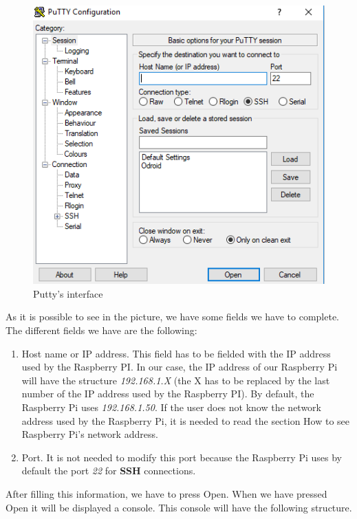 \begin{figure}[H]
\begin{centering}
\includegraphics[scale=1]{IMGS/putty_interface.PNG}
\caption{Putty's interface \label{Putty's interface}}
\end{centering}
\end{figure} 
 
As it is possible to see in the picture, we have some fields we have to complete. The different fields we have are the following:

\begin{enumerate}

\item Host name or IP address. This field has to be fielded with the IP address used by the Raspberry PI. In our case, the IP address of our Raspberry Pi will have the structure \textit{192.168.1.X} (the X has to be replaced by the last number of the IP address used by the Raspberry PI). By default, the Raspberry Pi uses \textit{192.168.1.50}. If the user does not know the network address used by the Raspberry Pi, it is needed to read the section How to see Raspberry Pi’s network address.

\item Port. It is not needed to modify this port because the Raspberry Pi uses by default the port \textit{22} for \textbf{SSH} connections.

\end{enumerate}

After filling this information, we have to press Open. When we have pressed Open it will be displayed a console. This console will have the following structure.

